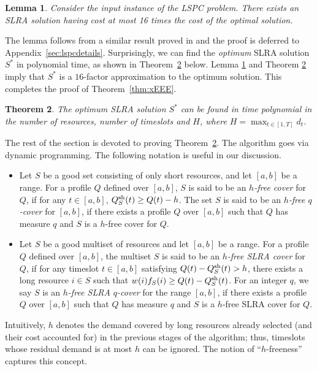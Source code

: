 \documentclass[11pt]{article}
\newtheorem{theorem}{Theorem}
\newtheorem{lemma}[theorem]{Lemma}
\newcommand{\lspc}{{\sc LSPC}}
\newcommand{\sh} {{\rm sh}}
\begin{document}
\begin{lemma}
\label{lem:SLRA}
Consider the input instance of the {\lspc} problem.
There exists an SLRA solution having cost at most 16 times the cost of the optimal solution.
\end{lemma}

The lemma follows from a similar result proved in \cite{esa2011} and
the proof is deferred to Appendix~\ref{sec:lspcdetails}.
Surprisingly, we can find the {\em optimum} SLRA solution $S^*$ in polynomial time, 
as shown in Theorem~\ref{thm:xGGG} below.
Lemma \ref{lem:SLRA} and Theorem \ref{thm:xGGG} imply that 
$S^*$ is a $16$-factor approximation to the optimum solution.
This completes the proof of Theorem~\ref{thm:xEEE}.

\begin{theorem}
\label{thm:xGGG}
The optimum SLRA solution $S^*$ can be found in time polynomial in the number of resources,
number of timeslots and $H$, where $H=\max_{t\in[1,T]} d_t$.
\end{theorem}

The rest of the section is devoted to proving Theorem~\ref{thm:xGGG}.
The algorithm goes via dynamic programming.
The following notation is useful in our discussion.
\begin{itemize}
\item
Let $S$ be a good set consisting of only short resources, and let $[a,b]$ be a range.
For a profile $Q$ defined over $[a,b]$, 
 $S$ is said to be an {\em $h$-free cover} for $Q$, if for any $t\in [a,b]$,
$Q^{\sh}_S(t)\geq Q(t)-h$.
The set $S$ is said to be an {\em $h$-free $q$-cover} for $[a,b]$,
if there exists a profile $Q$ over $[a,b]$  such that $Q$ has measure $q$ and $S$
is a $h$-free cover for $Q$.
\item 
Let $S$ be a good multiset of resources and let $[a,b]$ be a range.
For a profile $Q$ defined over $[a,b]$, 
the multiset $S$ is said to be an {\em $h$-free SLRA cover} for $Q$, 
if for any timeslot $t\in [a,b]$ satisfying $Q(t)-Q^{\sh}_S(t) > h$, 
there exists a long resource $i\in S$ such that $w(i)f_S(i)\geq Q(t)-Q^{\sh}_S(t)$.
For an integer $q$, we say $S$ is an {\em $h$-free SLRA $q$-cover} for the range $[a,b]$,
if there exists a profile $Q$ over $[a,b]$ such that $Q$ has measure $q$ and $S$
is a $h$-free SLRA cover for $Q$.
\end{itemize}
Intuitively, $h$ denotes the demand covered by long resources already selected (and their cost accounted for)
in the previous stages of the algorithm; thus, 
 timeslots whose residual demand is at most $h$ can be ignored.
The notion of ``$h$-freeness'' captures this concept.
\end{document}
